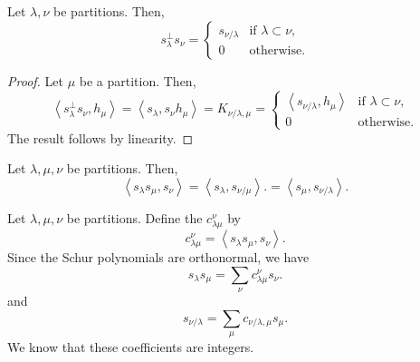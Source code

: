 \begin{theorem}
    Let \(\lambda, \nu\) be partitions.
    Then,
    \begin{equation}
        s_\lambda^\perp s_\nu =
        \begin{cases}
            s_{\nu / \lambda} & \text{if } \lambda \subset \nu, \\
            0 & \text{otherwise}.
        \end{cases}
    \end{equation}
\end{theorem}

\begin{proof}
    Let \(\mu\) be a partition.
    Then,
    \begin{equation}
        \left\langle s_\lambda^\perp s_\nu, h_\mu \right\rangle
        = \left\langle s_\lambda, s_\nu h_\mu \right\rangle
        = K_{\nu / \lambda, \mu}
        =
        \begin{cases}
            \left\langle s_{\nu / \lambda}, h_\mu \right\rangle & \text{if } \lambda \subset \nu, \\
            0 & \text{otherwise}.
        \end{cases}
    \end{equation}
    The result follows by linearity.
\end{proof}

\begin{corollary}
    Let \(\lambda, \mu, \nu\) be partitions.
    Then,
    \begin{equation}
        \left\langle s_\lambda s_\mu, s_\nu \right\rangle
        = \left\langle s_\lambda, s_{\nu / \mu} \right\rangle.
        = \left\langle s_\mu, s_{\nu / \lambda} \right\rangle.
    \end{equation}
\end{corollary}

Let \(\lambda, \mu, \nu\) be partitions.
Define the  \(c_{\lambda \mu}^\nu\) by
\begin{equation}
    c_{\lambda \mu}^\nu = \left\langle s_\lambda s_\mu, s_\nu \right\rangle.
\end{equation}
Since the Schur polynomials are orthonormal, we have
\begin{equation}
    s_\lambda s_\mu = \sum_{\nu} c_{\lambda \mu}^\nu s_\nu.
\end{equation}
and
\begin{equation}
    s_{\nu / \lambda} = \sum_{\mu} c_{\nu / \lambda, \mu} s_\mu.
\end{equation}
We know that these coefficients are integers.

